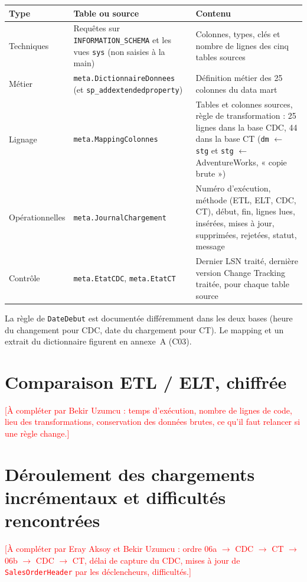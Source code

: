 \documentclass[10pt,a4paper]{article}
\newcommand{\todo}[1]{\textcolor{red}{[#1]}}
\begin{document}
\begingroup\small
\begin{tabularx}{\textwidth}{@{}>{\raggedright\arraybackslash}p{2.4cm}>{\raggedright\arraybackslash}p{4.8cm}X@{}}
\toprule
Type & Table ou source & Contenu \\
\midrule
Techniques & Requêtes sur \texttt{INFORMATION\_SCHEMA} et les vues \texttt{sys} (non saisies à la main) & Colonnes, types, clés et nombre de lignes des cinq tables sources \\
Métier & \texttt{meta.DictionnaireDonnees} (et \texttt{sp\_addextendedproperty}) & Définition métier des 25 colonnes du data mart \\
Lignage & \texttt{meta.MappingColonnes} & Tables et colonnes sources, règle de transformation : 25 lignes dans la base CDC, 44 dans la base CT (\texttt{dm} $\leftarrow$ \texttt{stg} et \texttt{stg} $\leftarrow$ AdventureWorks, « copie brute ») \\
Opérationnelles & \texttt{meta.JournalChargement} & Numéro d'exécution, méthode (ETL, ELT, CDC, CT), début, fin, lignes lues, insérées, mises à jour, supprimées, rejetées, statut, message \\
Contrôle & \texttt{meta.EtatCDC}, \texttt{meta.EtatCT} & Dernier LSN traité, dernière version Change Tracking traitée, pour chaque table source \\
\bottomrule
\end{tabularx}
\endgroup

La règle de \texttt{DateDebut} est documentée différemment dans les deux bases (heure du changement pour CDC, date du chargement pour CT). Le mapping et un extrait du dictionnaire figurent en annexe~A (C03).

\section{Comparaison ETL / ELT, chiffrée}
\todo{À compléter par Bekir Uzumcu : temps d'exécution, nombre de lignes de code, lieu des transformations, conservation des données brutes, ce qu'il faut relancer si une règle change.}

\section{Déroulement des chargements incrémentaux et difficultés rencontrées}
\todo{À compléter par Eray Aksoy et Bekir Uzumcu : ordre 06a $\rightarrow$ CDC $\rightarrow$ CT $\rightarrow$ 06b $\rightarrow$ CDC $\rightarrow$ CT, délai de capture du CDC, mises à jour de \texttt{SalesOrderHeader} par les déclencheurs, difficultés.}
\end{document}
